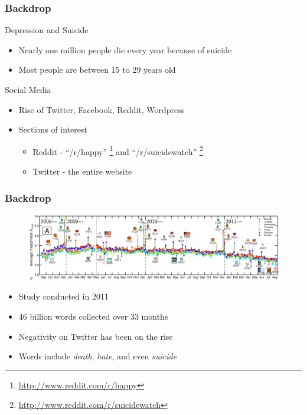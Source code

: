 \documentclass[xcolor=table]{beamer}
\begin{document}
    \begin{frame}
        \frametitle{Backdrop}
        \begin{block}{Depression and Suicide}
            \begin{itemize}
                \item{Nearly one million people die every year because of suicide}
                \item{Most people are between 15 to 29 years old}
            \end{itemize}
        \end{block}
        \pause
        \begin{block}{Social Media}
            \begin{itemize}
                \item{Rise of Twitter, Facebook, Reddit, Wordpress}
                \item{
                Sections of interest
                \begin{itemize}
                    \item{Reddit - ``/r/happy'' \footnote{\url{http://www.reddit.com/r/happy}} and ``/r/suicidewatch'' \footnote{\url{http://www.reddit.com/r/suicidewatch}}}
                    \item{Twitter - the entire website}
                \end{itemize}
                }
            \end{itemize}
        \end{block}
    \end{frame}
    
    \begin{frame}
        \frametitle{Backdrop}
        \begin{figure}
            \centering
            \includegraphics[width=\textwidth]{figures/twitter_happiness.png}
        \end{figure}
        \begin{itemize}
            \item{Study conducted in 2011}
            \item{46 billion words collected over 33 months}
            \item{Negativity on Twitter has been on the rise}
            \item{Words include \emph{death}, \emph{hate}, and even \emph{suicide}}
        \end{itemize}
    \end{frame}
    
\end{document}
